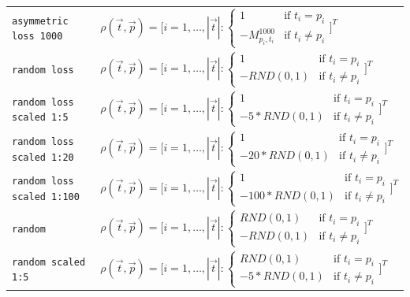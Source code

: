 \documentclass[twoside,11pt]{article}
\begin{document}
\begin{longtabu}{p{3cm}|X}
    \texttt{asymmetric loss 1000}
    &$\rho(\vec{t}, \vec{p}) = \Bigg[
      i=1,\dots,|\vec{t}|:
      \begin{cases}
        1  &\text{if } t_i = p_i \\
        -M^{1000}_{p_i,t_i} &\text{if } t_i \neq p_i
      \end{cases} \Bigg]^T$\\

    \texttt{random loss}
    &$\rho(\vec{t}, \vec{p}) = \Bigg[
      i=1,\dots,|\vec{t}|:
      \begin{cases}
        1  &\text{if } t_i = p_i \\
        -RND(0,1) &\text{if } t_i \neq p_i
      \end{cases} \Bigg]^T$\\

    \texttt{random loss scaled 1:5}
    &$\rho(\vec{t}, \vec{p}) = \Bigg[
      i=1,\dots,|\vec{t}|:
      \begin{cases}
        1  &\text{if } t_i = p_i \\
        -5*RND(0,1) &\text{if } t_i \neq p_i
      \end{cases} \Bigg]^T$\\

    \texttt{random loss scaled 1:20}
    &$\rho(\vec{t}, \vec{p}) = \Bigg[
      i=1,\dots,|\vec{t}|:
      \begin{cases}
        1  &\text{if } t_i = p_i \\
        -20 * RND(0,1) &\text{if } t_i \neq p_i
      \end{cases} \Bigg]^T$\\

    \texttt{random loss scaled 1:100}
    &$\rho(\vec{t}, \vec{p}) = \Bigg[
      i=1,\dots,|\vec{t}|:
      \begin{cases}
        1  &\text{if } t_i = p_i \\
        -100 * RND(0,1) &\text{if } t_i \neq p_i
      \end{cases}\Bigg]^T$\\

    \texttt{random}
    &$\rho(\vec{t}, \vec{p}) = \Bigg[
      i=1,\dots,|\vec{t}|:
      \begin{cases}
        RND(0,1) &\text{if } t_i = p_i \\
        -RND(0,1) &\text{if } t_i \neq p_i
      \end{cases} \Bigg]^T$\\

    \texttt{random scaled 1:5}
    &$\rho(\vec{t}, \vec{p}) = \Bigg[
      i=1,\dots,|\vec{t}|:
      \begin{cases}
        RND(0,1)  &\text{if } t_i = p_i \\
        -5 * RND(0,1) &\text{if } t_i \neq p_i
      \end{cases} \Bigg]^T$\\


\end{longtabu}
\end{document}
